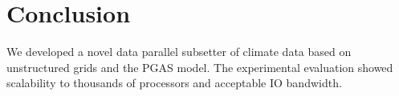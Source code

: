 \section{Conclusion}
\label{section:conclusion}

We developed a novel data parallel subsetter of climate data based on
unstructured grids and the PGAS model.  The experimental evaluation showed
scalability to thousands of processors and acceptable IO bandwidth.
